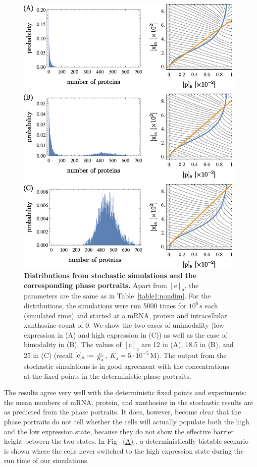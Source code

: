 \documentclass[10pt,letterpaper]{article}
\newcommand{\unit}[1]{\,\mathrm{#1}}
\newcommand{\n}[1]{\mathrm{#1}}
\newcommand*{\defeq}{\mathrel{\vcenter{\baselineskip0.5ex \lineskiplimit0pt
			\hbox{\scriptsize.}\hbox{\scriptsize.}}}%
	=}
\newcommand\subref[2]{%
	\def\myref{\getrefnumber{#1}}%
	\hyperref[#1]{\myref\mbox{#2}}%
}
\begin{document}
	
	\begin{figure}%
		\centering
		\includegraphics{media/HistogramsC.eps}
		\caption{{\bf Distributions from stochastic simulations and the corresponding phase portraits.}
			Apart from $\n{[c]_a}$, the parameters are the same as in
			Table~\ref{table1:nondim}. For the distributions, the simulations
			were run 5000 times for $10^6 \unit{s}$ each (simulated time) and
			started at a mRNA, protein and intracellular xanthosine count of 0.
			We show the two cases of unimodality (low expression in (A) and high
			expression in (C)) as well as the case of bimodality in (B). The
			values of $\n{[c]_a}$ are 12 in (A), 18.5 in (B), and 25 in (C)
			(recall $\n{[c]_{a}} \defeq \frac{c}{K_{\n{a}}}$, $K_{\n{a}} = 5
			\cdot 10^{-5} \unit{M}$). The output from the stochastic simulations
			is in good agreement with the concentrations at the fixed points in
			the deterministic phase portraits.}
		\label{fig8:stochC}
	\end{figure}
	
	The results agree very well with the deterministic fixed points and
	experiments: the mean numbers of mRNA, protein, and xanthosine in the
	stochastic results are as predicted from the phase portraits. It does,
	however, become clear that the phase portraits do not tell whether the cells
	will actually populate both the high and the low expression state,
	because they do not show the effective barrier height between the two states.
	In Fig~\subref{fig8:stochC}{(A)}, a deterministically bistable scenario is shown where the cells never switched to the high
	expression state during the run time of our simulations. 
	
\end{document}
